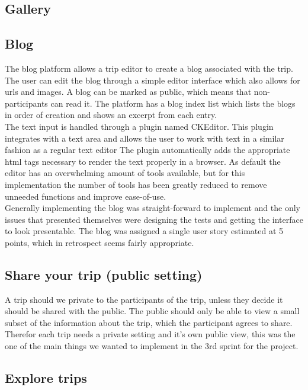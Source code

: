 \documentclass[a4paper]{article}
\begin{document}
\subsection{Gallery}
\subsection{Blog}
The blog platform allows a trip editor to create a blog associated with the trip. The user can edit the blog through a simple editor interface which also allows for urls and images. A blog can be marked as public, which means that non-participants can read it. The platform has a blog index list which lists the blogs in order of creation and shows an excerpt from each entry.\\

\noindent
The text input is handled through a plugin named CKEditor\cite{CKEditor}. This plugin integrates with a text area and allows the user to work with text in a similar fashion as a regular text editor The plugin automatically adds the appropriate html tags necessary to render the text properly in a browser. As default the editor has an overwhelming amount of tools available, but for this implementation the number of tools has been greatly reduced to remove unneeded functions and improve ease-of-use.\\

\noindent
Generally implementing the blog was straight-forward to implement and the only issues that presented themselves were designing the tests and getting the interface to look presentable. The blog was assigned a single user story estimated at 5 points, which in retrospect seems fairly appropriate.

\subsection{Share your trip (public setting)}
A trip should we private to the participants of the trip, unless they decide it should be shared with the public. The public should only be able to view a small subset of the information about the trip, which the participant agrees to share.  Therefor each trip needs a private setting and it's own public view, this was the one of the main things we wanted to implement in the 3rd sprint for the project. 

\subsection{Explore trips}
\end{document}
